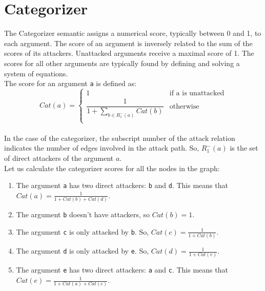 \documentclass{scrbook}
\begin{document}
\section{Categorizer}

The Categorizer semantic assigns a numerical score, typically between 0 and 1, to each argument. The score of an argument is inversely related to the sum of the scores of its attackers. Unattacked arguments receive a maximal score of 1. The scores for all other arguments are typically found by defining and solving a system of equations. \\

The score for an argument \texttt{a} is defined as:
\[
    Cat(a) =
    \begin{cases}
        1 & \text{if a is unattacked}\\
        \dfrac{1}{1 + \sum_{b\in R^-_1(a)}Cat(b)} & \text{otherwise} \\
    \end{cases}
\] \\

In the case of the categorizer, the subscript number of the attack relation indicates the number of edges involved in the attack path. So, $ R^-_1(a)$ is the set of direct attackers of the argument $a$. \\

Let us calculate the categorizer scores for all the nodes in the graph:

\begin{enumerate}[label=\alph*)]
    \item
    The argument \texttt{a} has two direct attackers: \texttt{b} and \texttt{d}. This means that $Cat(a) = \frac{1}{1 + Cat(b) + Cat(d)}$.

    \item 
    The argument \texttt{b} doesn't have attackers, so $Cat(b) = 1$.

    \item 
    The argument \texttt{c} is only attacked by \texttt{b}. So, $Cat(c) = \frac{1}{1 + Cat(b)}$.

    \item 
    The argument \texttt{d} is only attacked by \texttt{e}. So, $Cat(d) = \frac{1}{1 + Cat(e)}$.

    \item 
    The argument \texttt{e} has two direct attackers: \texttt{a} and \texttt{c}. This means that $Cat(e) = \frac{1}{1 + Cat(a) + Cat(c)}$.
\end{enumerate}
\end{document}
